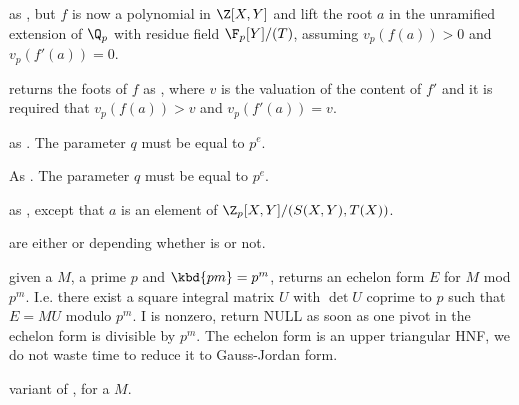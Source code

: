  as
, but $f$ is now a polynomial in $\Z[X,Y]$ and lift the
root $a$ in the unramified extension of $\Q_p$ with residue field $\F_p[Y]/(T)$,
assuming $v_p(f(a))>0$ and $v_p(f'(a))=0$.

returns the foots of $f$ as , where $v$ is the valuation
of the content of $f'$ and it is required that $v_p(f(a))>v$ and
$v_p(f'(a))=v$.



as . The parameter $q$ must be equal to $p^e$.

As . The parameter $q$ must be equal to $p^e$.

as , except that $a$ is an element of
$\Z_p[X,Y]/(S(X,Y),T(X))$.

 are either  or  depending whether  is  or not.






 given a
 $M$, a prime $p$ and $\kbd{pm} = p^m$, returns an echelon form
$E$ for $M$ mod $p^m$. I.e. there exist a square integral matrix $U$ with
$\det U$ coprime to $p$ such that $E = MU$ modulo $p^m$. I
 is nonzero, return NULL as soon as one pivot in
the echelon form is divisible by $p^m$. The echelon form is an upper
triangular HNF, we do not waste time to reduce it to Gauss-Jordan form.

variant of , for a  $M$.

